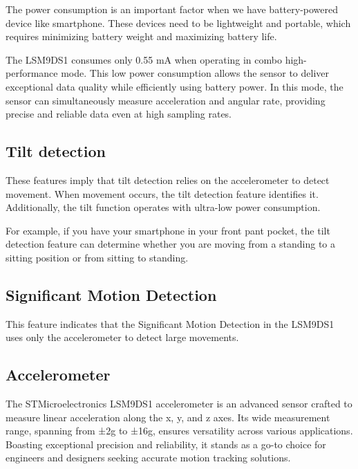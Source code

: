 \bigskip

The power consumption is an important factor when we have battery-powered device like smartphone. These devices need to be lightweight and portable, which requires minimizing battery weight and maximizing battery life.

\bigskip

The LSM9DS1 consumes only 0.55 mA when operating in combo high-performance mode. This low power consumption allows the sensor to deliver exceptional data quality while efficiently using battery power. In this mode, the sensor can simultaneously measure acceleration and angular rate, providing precise and reliable data even at high sampling rates.


\subsection{Tilt detection}

These features imply that tilt detection relies on the accelerometer to detect movement. When movement occurs, the tilt detection feature identifies it. Additionally, the tilt function operates with ultra-low power consumption. \cite{st_microelectronics:2024}

For example, if you have your smartphone in your front pant pocket, the tilt detection feature can determine whether you are moving from a standing to a sitting position or from sitting to standing.

\subsection{Significant Motion Detection}

This feature indicates that the Significant Motion Detection in the LSM9DS1 uses only the accelerometer to detect large movements.\cite{st_microelectronics:2024}


\subsection{Accelerometer}

The STMicroelectronics LSM9DS1 accelerometer is an advanced sensor crafted to measure linear acceleration along the x, y, and z axes. Its wide measurement range, spanning from ±2g to ±16g, ensures versatility across various applications. Boasting exceptional precision and reliability, it stands as a go-to choice for engineers and designers seeking accurate motion tracking solutions. \cite{STMicroelectronics_LSM9DS1:2024}
\bigskip 

